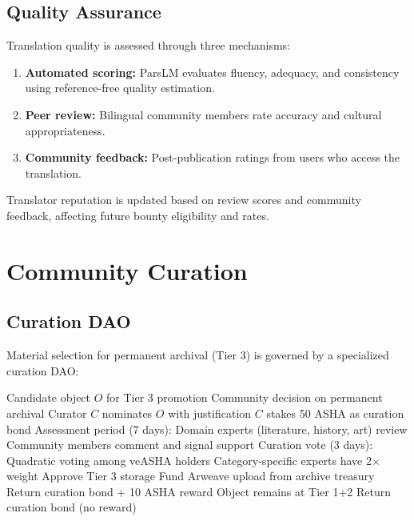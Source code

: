 \documentclass[11pt,a4paper]{article}
\begin{document}
\subsection{Quality Assurance}

Translation quality is assessed through three mechanisms:

\begin{enumerate}
    \item \textbf{Automated scoring:} ParsLM evaluates fluency, adequacy, and consistency using reference-free quality estimation.
    \item \textbf{Peer review:} Bilingual community members rate accuracy and cultural appropriateness.
    \item \textbf{Community feedback:} Post-publication ratings from users who access the translation.
\end{enumerate}

Translator reputation is updated based on review scores and community feedback, affecting future bounty eligibility and rates.

\section{Community Curation}

\subsection{Curation DAO}

Material selection for permanent archival (Tier 3) is governed by a specialized curation DAO:

\begin{algorithm}[H]
\caption{Curation Process}
\label{alg:curate}
\begin{algorithmic}[1]
\Require Candidate object $O$ for Tier 3 promotion
\Ensure Community decision on permanent archival
\State Curator $C$ nominates $O$ with justification
\State $C$ stakes 50 ASHA as curation bond
\State Assessment period (7 days):
\State \quad Domain experts (literature, history, art) review
\State \quad Community members comment and signal support
\State Curation vote (3 days):
\State \quad Quadratic voting among veASHA holders
\State \quad Category-specific experts have 2$\times$ weight
    \State Approve Tier 3 storage
    \State Fund Arweave upload from archive treasury
    \State Return curation bond + 10 ASHA reward
\Else
    \State Object remains at Tier 1+2
    \State Return curation bond (no reward)
\EndIf
\end{algorithmic}
\end{algorithm}
\end{document}
